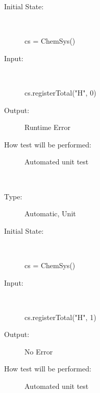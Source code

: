 \documentclass[12pt, titlepage]{article}
\newcounter{testnum} %
\begin{document}
\begin{addmargin}[2em]{0em}
\begin{addmargin}[2em]{0em}
\begin{description}
\item[Initial State:] ~\newline

\begin{python}
cs = ChemSys()
\end{python}
					
\item[Input:] ~\newline

\begin{python}
cs.registerTotal("H", 0) 
\end{python}
					
\item[Output:] Runtime Error
					
\item[How test will be performed:] Automated unit test\\
\end{description}
\end{addmargin}


\\
\begin{addmargin}[2em]{0em}
\begin{description}
\item[Type:] Automatic, Unit
					
\item[Initial State:] ~\newline

\begin{python}
cs = ChemSys()
\end{python}
					
\item[Input:] ~\newline

\begin{python}
cs.registerTotal("H", 1) 
\end{python}
					
\item[Output:] No Error
					
\item[How test will be performed:] Automated unit test\\
\end{description}
\end{addmargin}


\end{addmargin}
\end{document}

